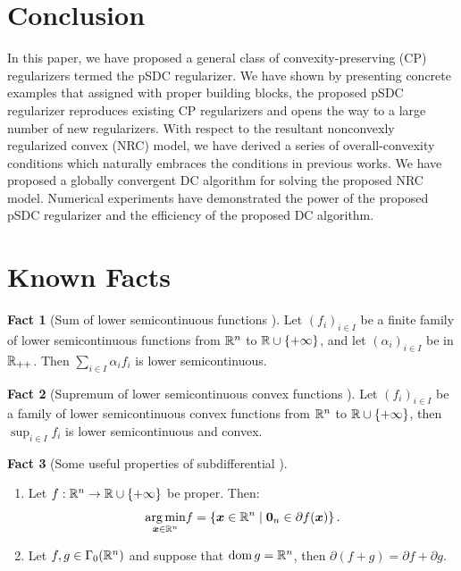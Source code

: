 \documentclass[lettersize,journal]{IEEEtran}
\theoremstyle{plain}%
\theoremstyle{definition}
\newtheorem{fact}{Fact}
\theoremstyle{remark}
\begin{document}
\section{Conclusion}\label{sec:conclusion}
In this paper, we have proposed a general class of convexity-preserving (CP) regularizers termed the pSDC regularizer. We have shown by presenting concrete examples that assigned with proper building blocks, the proposed pSDC regularizer reproduces existing CP regularizers and opens the way to a large number of new regularizers. With respect to the resultant nonconvexly regularized convex (NRC) model, we have derived a series of overall-convexity conditions which naturally embraces the conditions in previous works. We have proposed a globally convergent DC algorithm for solving the proposed NRC model. Numerical experiments have demonstrated the power of the proposed pSDC regularizer and the efficiency of the proposed DC algorithm.


\appendices

\section{Known Facts}\label{app:known_facts}
\begin{fact}[Sum of lower semicontinuous functions {\cite[Lemma 1.27]{bauschke2017}}]\label{fact:sum_of_ls_functions}
Let $(f_i)_{i\in I}$ be a finite family of lower semicontinuous functions from $\mathbb{R}^n$ to $\mathbb{R}\cup\left\{ +\infty \right\}$, and let $(\alpha_i)_{i\in I}$ be in $\mathbb{R}_{++}$. Then $\sum_{i\in I}\alpha_i f_i$ is lower semicontinuous.
\end{fact}

\begin{fact}[Supremum of lower semicontinuous convex functions {\cite[Prop. 9.3]{bauschke2017}}]\label{fact:sup_of_lsc_functions}
Let $(f_i)_{i\in I}$ be a family of lower semicontinuous convex functions from $\mathbb{R}^n$ to $\mathbb{R}\cup \left\{ +\infty \right\}$, then $\sup_{i\in I}f_i$ is lower semicontinuous and convex.
\end{fact}

\begin{fact}[Some useful properties of subdifferential {\cite[Thm. 16.3 and Corol. 16.48]{bauschke2017}}]\label{fact:sum_of_subdifferential}
\hfill
\begin{enumerate}
\item Let $f:\mathbb{R}^n\to\mathbb{R}\cup\left\{ +\infty \right\}$ be proper. Then:
\begin{equation*}
\underset{\bm{x}\in\mathbb{R}^n}{\mathrm{arg\,min}}{f}=\left\{ \bm{x}\in\mathbb{R}^n\mid \mathbf{0}_n\in\partial f(\bm{x}) \right\}.
\end{equation*}

\item Let $f,g\in\Gamma_0(\mathbb{R}^n)$ and suppose that $\textrm{dom\,}{g}=\mathbb{R}^n$, then $\partial (f+g)=\partial f+\partial g$. 
\end{enumerate}

\end{fact}
\end{document}
